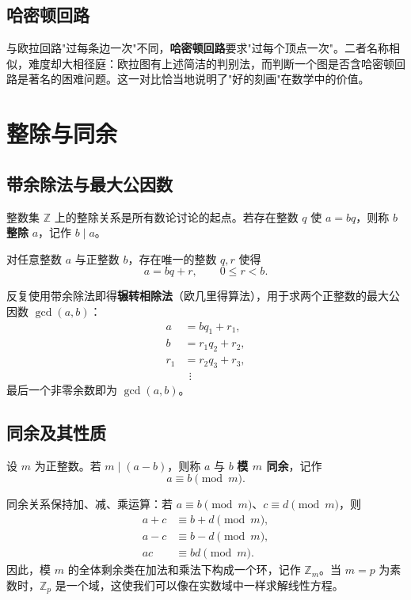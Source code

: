 	\section{哈密顿回路}
	与欧拉回路"过每条边一次"不同，\textbf{哈密顿回路}要求"过每个顶点一次"。二者名称相似，难度却大相径庭：欧拉图有上述简洁的判别法，而判断一个图是否含哈密顿回路是著名的困难问题。这一对比恰当地说明了"好的刻画"在数学中的价值。


	\chapter{整除与同余}
	\section{带余除法与最大公因数}
	整数集 $\mathbb{Z}$ 上的整除关系是所有数论讨论的起点。若存在整数 $q$ 使 $a=bq$，则称 $b$ \textbf{整除} $a$，记作 $b\mid a$。

	\begin{theorem}[带余除法]
		对任意整数 $a$ 与正整数 $b$，存在唯一的整数 $q,r$ 使得
		\[
			a=bq+r,\qquad 0\le r < b.
		\]
	\end{theorem}

	反复使用带余除法即得\textbf{辗转相除法}（欧几里得算法），用于求两个正整数的最大公因数 $\gcd(a,b)$：
	\begin{align*}
		a &= bq_1 + r_1, \\
		b &= r_1q_2 + r_2, \\
		r_1 &= r_2q_3 + r_3,\\
		&\ \ \vdots
	\end{align*}
	最后一个非零余数即为 $\gcd(a,b)$\cite{numbook}。

	\section{同余及其性质}
	\begin{definition}[同余]
		设 $m$ 为正整数。若 $m\mid(a-b)$，则称 $a$ 与 $b$ \textbf{模 $m$ 同余}，记作
		\[
			a\equiv b \pmod{m}.
		\]
	\end{definition}

	同余关系保持加、减、乘运算：若 $a\equiv b\pmod m$、$c\equiv d\pmod m$，则
	\begin{align*}
		a+c &\equiv b+d \pmod m,\\
		a-c &\equiv b-d \pmod m,\\
		ac &\equiv bd \pmod m.
	\end{align*}
	因此，模 $m$ 的全体剩余类在加法和乘法下构成一个环，记作 $\mathbb{Z}_m$。当 $m=p$ 为素数时，$\mathbb{Z}_p$ 是一个域，这使我们可以像在实数域中一样求解线性方程\cite{numart}。

